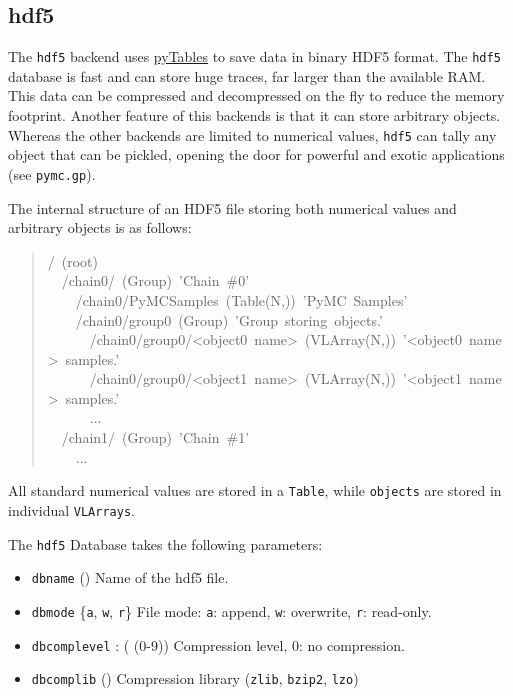 
\hypertarget{hdf5}{}
\subsection*{hdf5}
\label{hdf5}

The \texttt{hdf5} backend uses \href{http://www.pytables.org/moin}{pyTables} to save data in binary HDF5 format.
The \texttt{hdf5} database is fast and can store huge traces, far larger than the
available RAM. This data can be compressed and decompressed on the fly to
reduce the memory footprint.
Another feature of this backends is that it can store arbitrary objects.
Whereas the other backends are limited to numerical values, \texttt{hdf5} can
tally any object that can be pickled, opening the door for powerful and
exotic applications (see \texttt{pymc.gp}).

The internal structure of an HDF5 file storing both numerical values and
arbitrary objects is as follows:
\begin{quote}{\ttfamily \raggedright \noindent
/~(root)~\\
~~/chain0/~(Group)~'Chain~{\#}0'~\\
~~~~/chain0/PyMCSamples~(Table(N,))~'PyMC~Samples'~\\
~~~~/chain0/group0~(Group)~'Group~storing~objects.'~\\
~~~~~~/chain0/group0/<object0~name>~(VLArray(N,))~'<object0~name>~samples.'~\\
~~~~~~/chain0/group0/<object1~name>~(VLArray(N,))~'<object1~name>~samples.'~\\
~~~~~~...~\\
~~/chain1/~(Group)~'Chain~{\#}1'~\\
~~~~...
}\end{quote}

All standard numerical values are stored in a \texttt{Table}, while \texttt{objects}
are stored in individual \texttt{VLArrays}.

The \texttt{hdf5} Database takes the following parameters:
\begin{itemize}
\item {} 
\texttt{dbname} () Name of the hdf5 file.

\item {} 
\texttt{dbmode} {\{}\texttt{a}, \texttt{w}, \texttt{r}{\}} File mode: \texttt{a}: append, \texttt{w}: overwrite,
\texttt{r}: read-only.

\item {} 
\texttt{dbcomplevel} : ( (0-9)) Compression level, 0: no compression.

\item {} 
\texttt{dbcomplib} () Compression library (\texttt{zlib}, \texttt{bzip2}, \texttt{lzo})

\end{itemize}

